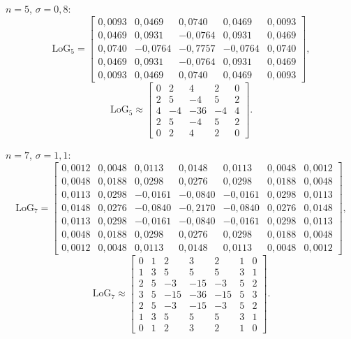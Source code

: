 $n = 5$, $\sigma = 0{,}8$:
\[
\mathrm{LoG}_5 = \begin{bmatrix}
0{,}0093 & 0{,}0469 & 0{,}0740 & 0{,}0469 & 0{,}0093 \\
0{,}0469 & 0{,}0931 & -0{,}0764 & 0{,}0931 & 0{,}0469 \\
0{,}0740 & -0{,}0764 & -0{,}7757 & -0{,}0764 & 0{,}0740 \\
0{,}0469 & 0{,}0931 & -0{,}0764 & 0{,}0931 & 0{,}0469 \\
0{,}0093 & 0{,}0469 & 0{,}0740 & 0{,}0469 & 0{,}0093
\end{bmatrix},
\]
\[
\mathrm{LoG}_5 \approx \begin{bmatrix}
0 & 2 & 4 & 2 & 0 \\ 2 & 5 & -4 & 5 & 2 \\ 4 & -4 & -36 & -4 & 4 \\ 2 & 5 & -4 & 5 & 2 \\ 0 & 2 & 4 & 2 & 0
\end{bmatrix}.
\]

$n = 7$, $\sigma = 1{,}1$:
\[
\mathrm{LoG}_7 = \begin{bmatrix}
0{,}0012 & 0{,}0048 & 0{,}0113 & 0{,}0148 & 0{,}0113 & 0{,}0048 & 0{,}0012 \\
0{,}0048 & 0{,}0188 & 0{,}0298 & 0{,}0276 & 0{,}0298 & 0{,}0188 & 0{,}0048 \\
0{,}0113 & 0{,}0298 & -0{,}0161 & -0{,}0840 & -0{,}0161 & 0{,}0298 & 0{,}0113 \\
0{,}0148 & 0{,}0276 & -0{,}0840 & -0{,}2170 & -0{,}0840 & 0{,}0276 & 0{,}0148 \\
0{,}0113 & 0{,}0298 & -0{,}0161 & -0{,}0840 & -0{,}0161 & 0{,}0298 & 0{,}0113 \\
0{,}0048 & 0{,}0188 & 0{,}0298 & 0{,}0276 & 0{,}0298 & 0{,}0188 & 0{,}0048 \\
0{,}0012 & 0{,}0048 & 0{,}0113 & 0{,}0148 & 0{,}0113 & 0{,}0048 & 0{,}0012
\end{bmatrix},
\]
\[
\mathrm{LoG}_7 \approx \begin{bmatrix}
0 & 1 & 2 & 3 & 2 & 1 & 0 \\
1 & 3 & 5 & 5 & 5 & 3 & 1 \\
2 & 5 & -3 & -15 & -3 & 5 & 2 \\
3 & 5 & -15 & -36 & -15 & 5 & 3 \\
2 & 5 & -3 & -15 & -3 & 5 & 2 \\
1 & 3 & 5 & 5 & 5 & 3 & 1 \\
0 & 1 & 2 & 3 & 2 & 1 & 0
\end{bmatrix}.
\]

